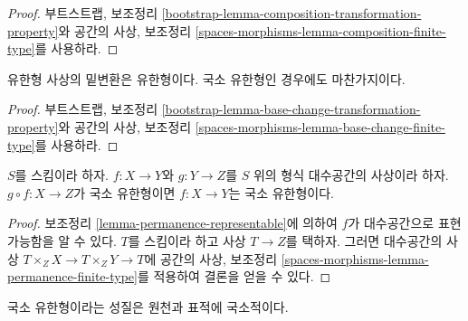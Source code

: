 \begin{proof}
부트스트랩, 보조정리
\ref{bootstrap-lemma-composition-transformation-property}와 공간의
사상, 보조정리
\ref{spaces-morphisms-lemma-composition-finite-type}를 사용하라.
\end{proof}

\begin{lemma}
\label{lemma-base-change-finite-type}
유한형 사상의 밑변환은 유한형이다. 국소 유한형인 경우에도
마찬가지이다.
\end{lemma}

\begin{proof}
부트스트랩, 보조정리
\ref{bootstrap-lemma-base-change-transformation-property}와 공간의
사상, 보조정리
\ref{spaces-morphisms-lemma-base-change-finite-type}를 사용하라.
\end{proof}

\begin{lemma}
\label{lemma-permanence-finite-type}
$S$를 스킴이라 하자. $f : X \to Y$와 $g : Y \to Z$를 $S$ 위의
형식 대수공간의 사상이라 하자. $g \circ f : X \to Z$가 국소
유한형이면 $f : X \to Y$는 국소 유한형이다.
\end{lemma}

\begin{proof}
보조정리 \ref{lemma-permanence-representable}에 의하여 $f$가
대수공간으로 표현 가능함을 알 수 있다. $T$를 스킴이라 하고 사상
$T \to Z$를 택하자. 그러면 대수공간의 사상
$T \times_Z X \to T \times_Z Y \to T$에 공간의 사상, 보조정리
\ref{spaces-morphisms-lemma-permanence-finite-type}를 적용하여 결론을
얻을 수 있다.
\end{proof}

\noindent
국소 유한형이라는 성질은 원천과 표적에 국소적이다.

